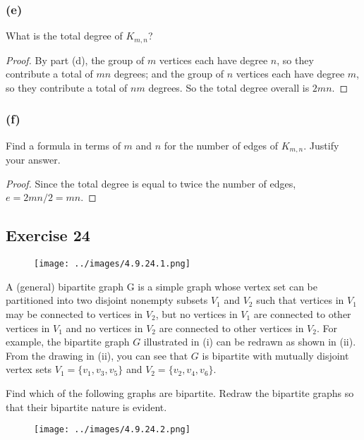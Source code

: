 \documentclass[14pt]{extarticle}
\begin{document}
\subsubsection{(e)}
What is the total degree of $K_{m,n}$?

\begin{proof}
    By part (d), the group of $m$ vertices each have degree $n$, so they contribute a total of $mn$ degrees; and the group of $n$ vertices each have degree $m$, so they contribute a total of $nm$ degrees. So the total degree overall is $2mn$.
\end{proof}

\subsubsection{(f)}
Find a formula in terms of $m$ and $n$ for the number of edges of $K_{m,n}$. Justify your answer.

\begin{proof}
    Since the total degree is equal to twice the number of edges, $e = 2mn / 2 = mn$.
\end{proof}

\subsection{Exercise 24}
\begin{figure}[ht!]
    \centering
    \texttt{[image: ../images/4.9.24.1.png]}
\end{figure}

A (general) bipartite graph G is a simple graph whose vertex set can be partitioned into two disjoint nonempty subsets $V_1$ and $V_2$ such that vertices in $V_1$ may be connected to vertices in $V_2$, but no vertices in $V_1$ are connected to other vertices in $V_1$ and no vertices in $V_2$ are connected to other vertices in $V_2$. For example, the bipartite graph $G$ illustrated in (i) can be redrawn as shown in (ii). From the drawing in (ii), you can see that $G$ is bipartite with mutually disjoint vertex sets $V_1 = \{v_1, v_3, v_5\}$ and $V_2 = \{v_2, v_4, v_6\}$.

Find which of the following graphs are bipartite. Redraw the bipartite graphs so that their bipartite nature is evident.

\begin{figure}[ht!]
    \centering
    \texttt{[image: ../images/4.9.24.2.png]}
\end{figure}
\end{document}
